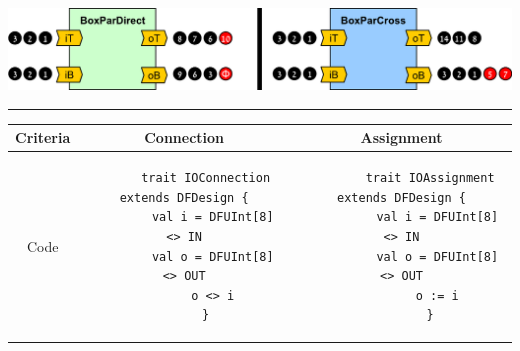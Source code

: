 \begin{table}[t!]
\begin{minipage}[t][12cm][b]{0.64\linewidth}
    \vfill
    \label{fig:BoxTopDraw}
    \includegraphics[width=0.9\linewidth]{graphics/connectivityTokens.pdf}
    \label{fig:BoxTopTokens}
  \end{minipage}%
  \vspace{2ex}
  \hrule
  \vspace{2ex}
  \label{tbl:Box}
  \begin{tabular}{|c|c|c|}
    \hline 
    \textbf{Criteria} & \textbf{Connection \code{<>}} & \textbf{Assignment \code{:=}} \\ 
    \hline
    \begin{minipage}{0.1\textwidth}
      \flushleft
      Code
    \end{minipage} 
    &
    \begin{minipage}[c][1.5cm]{0.4\textwidth}
      \begin{verbatim}
      trait IOConnection extends DFDesign {
        val i = DFUInt[8] <> IN
        val o = DFUInt[8] <> OUT
        o <> i
      }
      \end{verbatim}
    \end{minipage} 
    &  
    \begin{minipage}[c][1.5cm]{0.4\textwidth}
      \begin{verbatim}
        trait IOAssignment extends DFDesign {
          val i = DFUInt[8] <> IN
          val o = DFUInt[8] <> OUT
          o := i
        }
      \end{verbatim}
    \end{minipage} 
    \\ 

\end{tabular}
\end{table}

